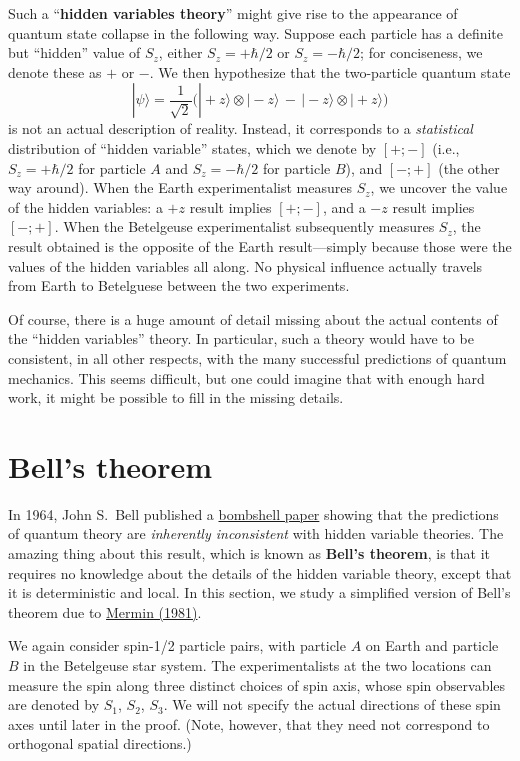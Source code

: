 \documentclass[pra,11pt]{revtex4}
\begin{document}
Such a ``\textbf{hidden variables theory}'' might give rise to the
appearance of quantum state collapse in the following way.  Suppose
each particle has a definite but ``hidden'' value of $S_z$, either
$S_z = +\hbar/2$ or $S_z = -\hbar/2$; for conciseness, we denote these
as $+$ or $-$.  We then hypothesize that the two-particle quantum state
$$|\psi\rangle = \frac{1}{\sqrt{2}} \Big(|\!+\!z\rangle\otimes|\!-\!z\rangle \,-\, |\!-\!z\rangle\otimes|\!+\!z\rangle\Big)$$
is not an actual description of reality.  Instead, it corresponds to a
\textit{statistical} distribution of ``hidden variable'' states, which
we denote by $[+;-]$ (i.e., $S_z = +\hbar/2$ for particle $A$ and $S_z
= -\hbar/2$ for particle $B$), and $[-;+]$ (the other way around).
When the Earth experimentalist measures $S_z$, we uncover the value of
the hidden variables: a $+z$ result implies $[+;-]$, and a $-z$ result
implies $[-;+]$.  When the Betelgeuse experimentalist subsequently
measures $S_z$, the result obtained is the opposite of the Earth
result---simply because those were the values of the hidden variables
all along.  No physical influence actually travels from Earth to
Betelguese between the two experiments.

Of course, there is a huge amount of detail missing about the actual
contents of the ``hidden variables'' theory.  In particular, such a
theory would have to be consistent, in all other respects, with the
many successful predictions of quantum mechanics.  This seems
difficult, but one could imagine that with enough hard work, it might
be possible to fill in the missing details.

\section{Bell's theorem}

In 1964, John S.~Bell published a \hyperref[cite:bell]{bombshell
  paper} showing that the predictions of quantum theory are
\textit{inherently inconsistent} with hidden variable theories.  The
amazing thing about this result, which is known as \textbf{Bell's
  theorem}, is that it requires no knowledge about the details of the
hidden variable theory, except that it is deterministic and local.  In
this section, we study a simplified version of Bell's theorem due to
\hyperref[cite:mermin]{Mermin (1981)}.

We again consider spin-1/2 particle pairs, with particle $A$ on Earth
and particle $B$ in the Betelgeuse star system.  The experimentalists
at the two locations can measure the spin along three distinct choices
of spin axis, whose spin observables are denoted by $S_1$, $S_2$,
$S_3$.  We will not specify the actual directions of these spin axes
until later in the proof.  (Note, however, that they need not
correspond to orthogonal spatial directions.)
\end{document}

